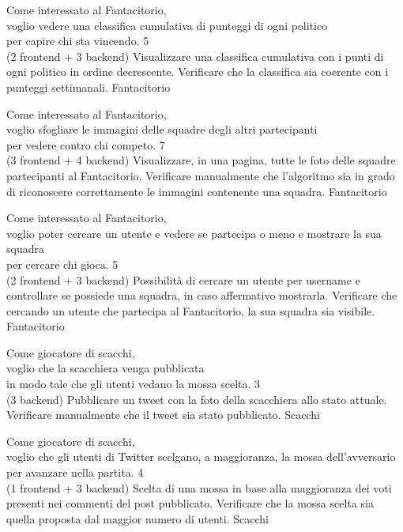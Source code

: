 \userstory%
{Come interessato al Fantacitorio,\\voglio vedere una classifica cumulativa di punteggi di ogni politico\\per capire chi sta vincendo.}%
{5\\(2 frontend + 3 backend)}%
{Visualizzare una classifica cumulativa con i punti di ogni politico in ordine decrescente.}%
{Verificare che la classifica sia coerente con i punteggi settimanali.}
{Fantacitorio}

\userstory%
{Come interessato al Fantacitorio,\\voglio sfogliare le immagini delle squadre degli altri partecipanti\\per vedere contro chi competo.}%
{7\\(3 frontend + 4 backend)}%
{Visualizzare, in una pagina, tutte le foto delle squadre partecipanti al Fantacitorio.}%
{Verificare manualmente che l'algoritmo sia in grado di riconoscere correttamente le immagini contenente una squadra.}
{Fantacitorio}

\userstory%
{Come interessato al Fantacitorio,\\voglio poter cercare un utente e vedere se partecipa o meno e mostrare la sua squadra\\per cercare chi gioca.}%
{5\\(2 frontend + 3 backend)}%
{Possibilità di cercare un utente per username e controllare se possiede una squadra, in caso affermativo mostrarla.}%
{Verificare che cercando un utente che partecipa al Fantacitorio, la sua squadra sia visibile.}
{Fantacitorio}

\userstory%
{Come giocatore di scacchi,\\voglio che la scacchiera venga pubblicata\\in modo tale che gli utenti vedano la mossa scelta.}%
{3\\(3 backend)}%
{Pubblicare un tweet con la foto della scacchiera allo stato attuale.}%
{Verificare manualmente che il tweet sia stato pubblicato.}
{Scacchi}

\userstory%
{Come giocatore di scacchi,\\voglio che gli utenti di Twitter scelgano, a maggioranza, la mossa dell'avversario\\per avanzare nella partita.}%
{4\\(1 frontend + 3 backend)}%
{Scelta di una mossa in base alla maggioranza dei voti presenti nei commenti del post pubblicato.}%
{Verificare che la mossa scelta sia quella proposta dal maggior numero di utenti.}
{Scacchi}

